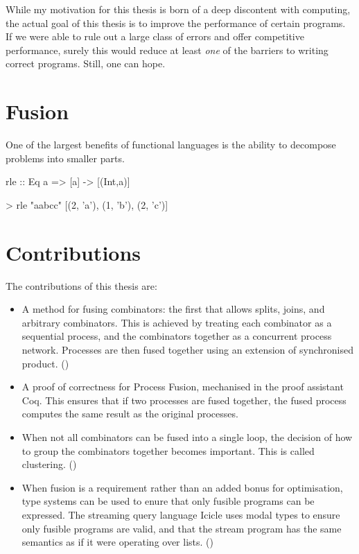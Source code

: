 While my motivation for this thesis is born of a deep discontent with computing, the actual goal of this thesis is to improve the performance of certain programs.
If we were able to rule out a large class of errors and offer competitive performance, surely this would reduce at least \emph{one} of the barriers to writing correct programs.
Still, one can hope.

\section{Fusion}

One of the largest benefits of functional languages is the ability to decompose problems into smaller parts. 

\begin{code}
rle :: Eq a => [a] -> [(Int,a)]

> rle "aabcc"
[(2, 'a'), (1, 'b'), (2, 'c')]
\end{code}

\section{Contributions}

The contributions of this thesis are:

\begin{itemize}
\item
A method for fusing combinators: the first that allows splits, joins, and arbitrary combinators.
This is achieved by treating each combinator as a sequential process, and the combinators together as a concurrent process network.
Processes are then fused together using an extension of synchronised product.
()

\item
A proof of correctness for Process Fusion, mechanised in the proof assistant Coq.
This ensures that if two processes are fused together, the fused process computes the same result as the original processes.

\item
When not all combinators can be fused into a single loop, the decision of how to group the combinators together becomes important.
This is called clustering.
()

\item
When fusion is a requirement rather than an added bonus for optimisation, type systems can be used to enure that only fusible programs can be expressed.
The streaming query language Icicle uses modal types to ensure only fusible programs are valid, and that the stream program has the same semantics as if it were operating over lists.
()
\end{itemize}


